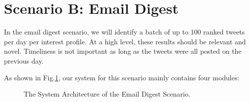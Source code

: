 \section{Scenario B: Email Digest}
In the email digest scenario,
we will identify a batch of up to 100 ranked tweets per day per interest profile.
At a high level, these results should be relevant and novel.
Timeliness is not important as long as the tweets were all posted on the previous day.

As shown in Fig.\ref{fig:Bsys}, our system for this scenario mainly contains four modules:

\begin{figure}[htbp]
\caption{The System Architecture of the Email Digest Scenario.}
\label{fig:Bsys}
\end{figure}

